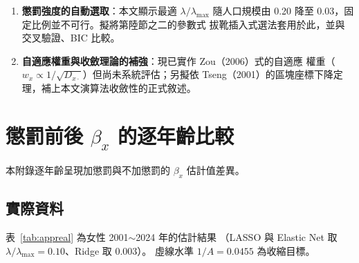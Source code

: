 \documentclass[UTF8, fontset=macnew, a4paper, 12pt]{ctexart}
\renewcommand{\thesection}{\chinese{section}}
\begin{document}
\begin{enumerate}[leftmargin=*]
        檢驗第陸節之五的「長配適期較佳」結論是否反轉；
        \textbf{（三）過度離散}，改以負二項產生死亡數，
        檢驗以卜瓦松為基礎的兩步校正是否仍然有效；
        \textbf{（四）極端稀疏}，將人口降至 5,000 人以測定方法的下限。
        各項均以\textbf{涵蓋率與漂移項偏誤}為主要指標，
        並以本文現行設定為對照組，\textbf{報告「在何種條件下本方法不應
        使用」}，作為實務應用的邊界說明。
  \item \textbf{懲罰強度的自動選取}：本文顯示最適 $\lambda/\lambda_{\max}$
        隨人口規模由 0.20 降至 0.03，固定比例並不可行。擬將第陸節之二的參數式
        拔靴插入式選法套用於此，並與交叉驗證、BIC 比較。
  \item \textbf{自適應權重與收斂理論的補強}：現已實作 Zou（2006）式的自適應
        權重（$w_x\propto1/\sqrt{D_{x\cdot}}$）但尚未系統評估；另擬依
        Tseng（2001）的區塊座標下降定理，補上本文演算法收斂性的正式敘述。
\end{enumerate}

\appendix
\setcounter{section}{0}
\setcounter{table}{0}
\setcounter{figure}{0}
\renewcommand{\thesection}{附錄\Alph{section}}
\renewcommand{\thetable}{\Alph{section}\arabic{table}}
\renewcommand{\thefigure}{\Alph{section}\arabic{figure}}

\section{懲罰前後 $\beta_x$ 的逐年齡比較}

本附錄逐年齡呈現加懲罰與不加懲罰的 $\beta_x$ 估計值差異。

\subsection{實際資料}

表~\ref{tab:appreal} 為女性 2001$\sim$2024 年的估計結果
（LASSO 與 Elastic Net 取 $\lambda/\lambda_{\max}=0.10$、Ridge 取 0.003）。
虛線水準 $1/A=0.0455$ 為收縮目標。
\end{document}
